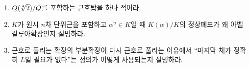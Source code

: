 \begin{checkpoint}
\begin{enumerate}[label=(\alph*)]
  \item $Q(\sqrt[4]{2})/Q$를 포함하는 근호탑을 하나 적어라.
  \item $K$가 원시 $n$차 단위근을 포함하고 $\alpha^n\in K$일 때 $K(\alpha)/K$의 정상폐포가 왜 아벨 갈루아확장인지 설명하라.
  \item 근호로 풀리는 확장의 부분확장이 다시 근호로 풀리는 이유에서 ``마지막 체가 정확히 $L$일 필요가 없다''는 정의가 어떻게 사용되는지 설명하라.
\end{enumerate}
\end{checkpoint}
